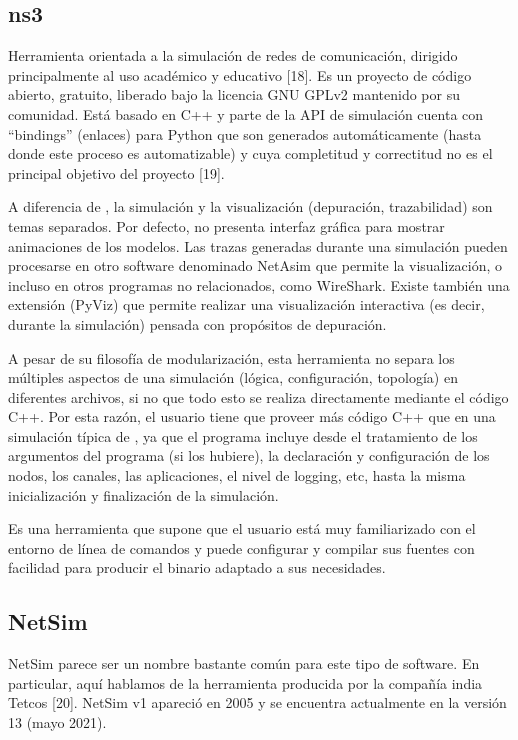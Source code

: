 \subsection{ns3}

Herramienta orientada a la simulación de redes de comunicación, dirigido
principalmente al uso académico y educativo [18]. Es un proyecto de código
abierto, gratuito, liberado bajo la licencia GNU GPLv2 mantenido por su
comunidad. Está basado en C++ y parte de la API de simulación cuenta con
``bindings'' (enlaces) para Python que son generados automáticamente (hasta
donde este proceso es automatizable) y cuya completitud y correctitud no es el
principal objetivo del proyecto [19].

A diferencia de \omnetpp{}, la simulación y la visualización (depuración,
trazabilidad) son temas separados. Por defecto, no presenta interfaz gráfica
para mostrar animaciones de los modelos. Las trazas generadas durante una
simulación pueden procesarse en otro software denominado NetAsim que permite la
visualización, o incluso en otros programas no relacionados, como WireShark.
Existe también una extensión (PyViz) que permite realizar una visualización
interactiva (es decir, durante la simulación) pensada con propósitos de
depuración.

A pesar de su filosofía de modularización, esta herramienta no separa los
múltiples aspectos de una simulación (lógica, configuración, topología) en
diferentes archivos, si no que todo esto se realiza directamente mediante el
código C++. Por esta razón, el usuario tiene que proveer más código C++ que en
una simulación típica de \omnetpp{}, ya que el programa incluye desde el
tratamiento de los argumentos del programa (si los hubiere), la declaración y
configuración de los nodos, los canales, las aplicaciones, el nivel de logging,
etc, hasta la misma inicialización y finalización de la simulación.

Es una herramienta que supone que el usuario está muy familiarizado con el
entorno de línea de comandos y puede configurar y compilar sus fuentes con
facilidad para producir el binario adaptado a sus necesidades.

\subsection{NetSim}

NetSim parece ser un nombre bastante común para este tipo de software. En
particular, aquí hablamos de la herramienta producida por la compañía india
Tetcos [20]. NetSim v1 apareció en 2005 y se encuentra actualmente en la
versión 13 (mayo 2021).

